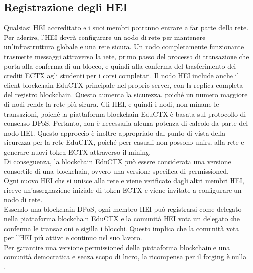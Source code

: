 \subsection{Registrazione degli HEI}
Qualsiasi HEI accreditato e i suoi membri potranno entrare a far parte della rete. 
Per aderire, l’HEI dovrà configurare un nodo di rete per mantenere un’infrastruttura globale e una rete sicura. 
Un nodo completamente funzionante trasmette messaggi attraverso la rete, primo passo del processo di transazione che porta alla conferma di un blocco, e quindi alla conferma del trasferimento dei crediti ECTX agli studenti per i corsi completati. 
Il nodo HEI include anche il client blockchain EduCTX principale nel proprio server, con la replica completa del registro blockchain. Questo aumenta la sicurezza, poiché un numero maggiore di nodi rende la rete più sicura.
Gli HEI, e quindi i nodi, non minano le transazioni, poiché la piattaforma blockchain EduCTX è basata sul protocollo di consenso DPoS. Pertanto, non è necessaria alcuna potenza di calcolo da parte del nodo HEI. 
Questo approccio è inoltre appropriato dal punto di vista della sicurezza per la rete EduCTX, poiché peer casuali non possono unirsi alla rete e generare nuovi token ECTX attraverso il mining. 
\\Di conseguenza, la blockchain EduCTX può essere considerata una versione consortile di una blockchain, ovvero una versione specifica di permissioned.
\\Ogni nuovo HEI che si unisce alla rete e viene verificato dagli altri membri HEI, riceve un’assegnazione iniziale di token ECTX e viene invitato a configurare un nodo di rete. 
\\Essendo una blockchain DPoS, ogni membro HEI può registrarsi come delegato nella piattaforma blockchain EduCTX e la comunità HEI vota un delegato che conferma le transazioni e sigilla i blocchi. 
Questo implica che la comunità vota per l’HEI più attivo e continuo nel suo lavoro. 
\\Per garantire una versione permissioned della piattaforma blockchain e una comunità democratica e senza scopo di lucro, la ricompensa per il forging è nulla \cite{EduCTX}.

